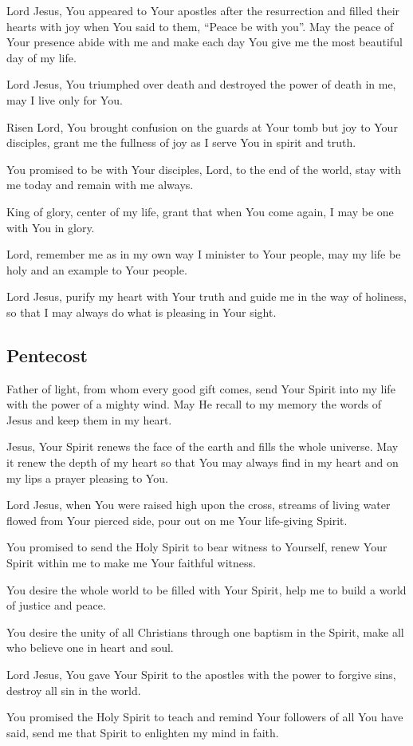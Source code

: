 \documentclass[12pt]{article}
\newcommand{\prayertitle}[1]{\subsection{#1}}
\begin{document}
Lord Jesus, You appeared to Your apostles after the resurrection and filled their hearts with joy when You said to them, ``Peace be with you''.
May the peace of Your presence abide with me and make each day You give me the most beautiful day of my life.

Lord Jesus, You triumphed over death and destroyed the power of death in me, may I live only for You.

Risen Lord, You brought confusion on the guards at Your tomb but joy to Your disciples, grant me the fullness of joy as I serve You in spirit and truth.

You promised to be with Your disciples, Lord, to the end of the world, stay with me today and remain with me always.

King of glory, center of my life, grant that when You come again, I may be one with You in glory.

Lord, remember me as in my own way I minister to Your people, may my life be holy and an example to Your people.

Lord Jesus, purify my heart with Your truth and guide me in the way of holiness, so that I may always do what is pleasing in Your sight.

\prayertitle{Pentecost}
Father of light, from whom every good gift comes, send Your Spirit into my life with the power of a mighty wind.
May He recall to my memory the words of Jesus and keep them in my heart.

Jesus, Your Spirit renews the face of the earth and fills the whole universe.
May it renew the depth of my heart so that You may always find in my heart and on my lips a prayer pleasing to You.

Lord Jesus, when You were raised high upon the cross, streams of living water flowed from Your pierced side, pour out on me Your life-giving Spirit.

You promised to send the Holy Spirit to bear witness to Yourself, renew Your Spirit within me to make me Your faithful witness.

You desire the whole world to be filled with Your Spirit, help me to build a world of justice and peace.

You desire the unity of all Christians through one baptism in the Spirit, make all who believe one in heart and soul.

Lord Jesus, You gave Your Spirit to the apostles with the power to forgive sins, destroy all sin in the world.

You promised the Holy Spirit to teach and remind Your followers of all You have said, send me that Spirit to enlighten my mind in faith.
\end{document}

